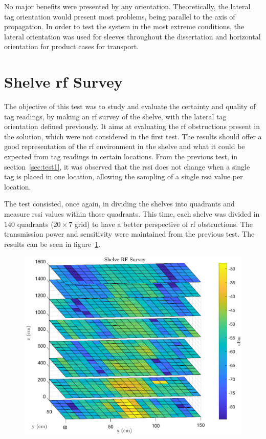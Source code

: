 No major benefits were presented by any orientation.
Theoretically, the lateral tag orientation would present most problems, being parallel to the axis of propagation.
In order to test the system in the most extreme conditions, the lateral orientation was used for sleeves throughout the dissertation and horizontal orientation for product cases for transport.

\section{Shelve \acs{rf} Survey}

The objective of this test was to study and evaluate the certainty and quality of tag readings, by making an \ac{rf} survey of the shelve, with the lateral tag orientation defined previously.
It aims at evaluating the \ac{rf} obstructions present in the solution, which were not considered in the first test.
The results should offer a good representation of the \ac{rf} environment in the shelve and what it could be expected from tag readings in certain locations. 
From the previous test, in section~\ref{sec:test1}, it was observed that the \ac{rssi} does not change when a single tag is placed in one location, allowing the sampling of a single \ac{rssi} value per location. 

The test consisted, once again, in dividing the shelves into quadrants and measure \ac{rssi} values within those quadrants. This time, each shelve was divided in $140$ quadrants ($20\times7$ grid) to have a better perspective of \ac{rf} obstructions. The transmission power and sensitivity were maintained from the previous test.
The results can be seen in figure~\ref{fig:rfsurvey}.

\begin{figure}
    \centering
    \includegraphics[width=0.7\linewidth]{./figs/tests/rfsurvey.eps}
    \caption{}
    \label{fig:rfsurvey}
\end{figure}

